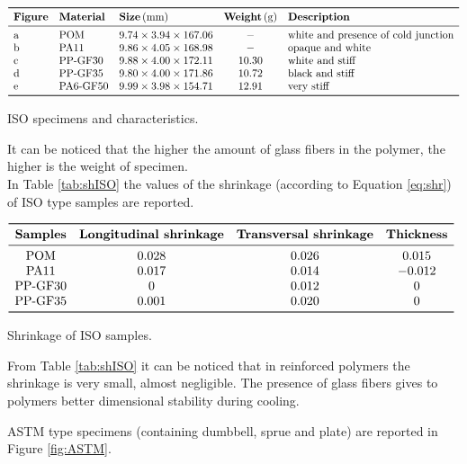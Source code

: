 \documentclass[a4paper, 11pt]{article}
\begin{document}
\begin{table}[htp]
\centering
$
\begin{array}{lllcl}
\toprule
\textbf{Figure} & \textbf{Material} & \textbf{Size}\,(\text{mm}) & \textbf{Weight}\,(\text{g}) & \textbf{Description} \\
\midrule
\text{a} & \text{POM} & 9.74\times 3.94\times 167.06 & - & \text{white and presence of cold junction}\\
\text{b} & \text{PA11} & 9.86\times 4.05\times 168.98 & - & \text{opaque and white}\\
\text{c} & \text{PP-GF30} & 9.88\times 4.00\times 172.11 & 10.30 & \text{white and stiff}\\
\text{d} & \text{PP-GF35} & 9.80\times 4.00\times 171.86 & 10.72 & \text{black and stiff}\\
\text{e} & \text{PA6-GF50} & 9.99\times 3.98\times 154.71 & 12.91 & \text{very stiff}\\
\bottomrule
\end{array}
$
\caption{ISO specimens and characteristics.}
\label{tab:ISO}
\end{table}

It can be noticed that the higher the amount of glass fibers in the polymer, the higher is the weight of specimen. \\
In Table \ref{tab:shISO} the values of the shrinkage (according to Equation \ref{eq:shr}) of ISO type samples are reported.

\begin{table}[h!]
\centering
$
\begin{array}{cccc}
\toprule
\textbf{Samples} & \textbf{Longitudinal shrinkage} & \textbf{Transversal shrinkage} & \textbf{Thickness} \\
\midrule
\text{POM} & 0.028 & 0.026 & 0.015 \\
\text{PA11} & 0.017 & 0.014 & -0.012 \\
\text{PP-GF30} & 0 & 0.012 & 0  \\
\text{PP-GF35} & 0.001 & 0.020 & 0  \\
\bottomrule
\end{array}
$
\caption{Shrinkage of ISO samples.}
\label{tab:shISO}
\end{table}

From Table \ref{tab:shISO} it can be noticed that in reinforced polymers the shrinkage is very small, almost negligible. The presence of glass fibers gives to polymers better dimensional stability during cooling. 

ASTM type specimens (containing dumbbell, sprue and plate) are reported in Figure \ref{fig:ASTM}.
\end{document}
